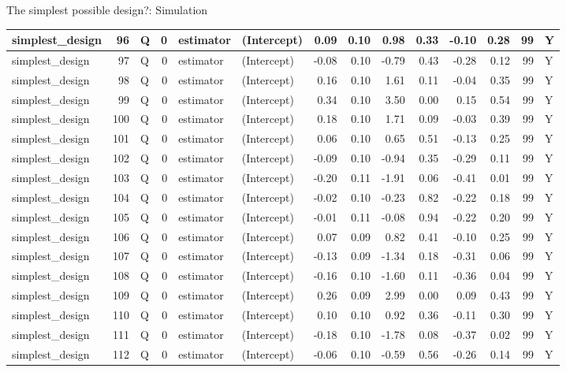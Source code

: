 \documentclass[
  11pt,
  ignorenonframetext,
]{beamer}
\begin{document}
\begin{frame}[fragile]{The simplest possible design?: Simulation}
\begin{tabular}{l|r|l|r|l|l|r|r|r|r|r|r|r|l}
\hline
simplest\_design & 96 & Q & 0 & estimator & (Intercept) & 0.09 & 0.10 & 0.98 & 0.33 & -0.10 & 0.28 & 99 & Y\\
\hline
simplest\_design & 97 & Q & 0 & estimator & (Intercept) & -0.08 & 0.10 & -0.79 & 0.43 & -0.28 & 0.12 & 99 & Y\\
\hline
simplest\_design & 98 & Q & 0 & estimator & (Intercept) & 0.16 & 0.10 & 1.61 & 0.11 & -0.04 & 0.35 & 99 & Y\\
\hline
simplest\_design & 99 & Q & 0 & estimator & (Intercept) & 0.34 & 0.10 & 3.50 & 0.00 & 0.15 & 0.54 & 99 & Y\\
\hline
simplest\_design & 100 & Q & 0 & estimator & (Intercept) & 0.18 & 0.10 & 1.71 & 0.09 & -0.03 & 0.39 & 99 & Y\\
\hline
simplest\_design & 101 & Q & 0 & estimator & (Intercept) & 0.06 & 0.10 & 0.65 & 0.51 & -0.13 & 0.25 & 99 & Y\\
\hline
simplest\_design & 102 & Q & 0 & estimator & (Intercept) & -0.09 & 0.10 & -0.94 & 0.35 & -0.29 & 0.11 & 99 & Y\\
\hline
simplest\_design & 103 & Q & 0 & estimator & (Intercept) & -0.20 & 0.11 & -1.91 & 0.06 & -0.41 & 0.01 & 99 & Y\\
\hline
simplest\_design & 104 & Q & 0 & estimator & (Intercept) & -0.02 & 0.10 & -0.23 & 0.82 & -0.22 & 0.18 & 99 & Y\\
\hline
simplest\_design & 105 & Q & 0 & estimator & (Intercept) & -0.01 & 0.11 & -0.08 & 0.94 & -0.22 & 0.20 & 99 & Y\\
\hline
simplest\_design & 106 & Q & 0 & estimator & (Intercept) & 0.07 & 0.09 & 0.82 & 0.41 & -0.10 & 0.25 & 99 & Y\\
\hline
simplest\_design & 107 & Q & 0 & estimator & (Intercept) & -0.13 & 0.09 & -1.34 & 0.18 & -0.31 & 0.06 & 99 & Y\\
\hline
simplest\_design & 108 & Q & 0 & estimator & (Intercept) & -0.16 & 0.10 & -1.60 & 0.11 & -0.36 & 0.04 & 99 & Y\\
\hline
simplest\_design & 109 & Q & 0 & estimator & (Intercept) & 0.26 & 0.09 & 2.99 & 0.00 & 0.09 & 0.43 & 99 & Y\\
\hline
simplest\_design & 110 & Q & 0 & estimator & (Intercept) & 0.10 & 0.10 & 0.92 & 0.36 & -0.11 & 0.30 & 99 & Y\\
\hline
simplest\_design & 111 & Q & 0 & estimator & (Intercept) & -0.18 & 0.10 & -1.78 & 0.08 & -0.37 & 0.02 & 99 & Y\\
\hline
simplest\_design & 112 & Q & 0 & estimator & (Intercept) & -0.06 & 0.10 & -0.59 & 0.56 & -0.26 & 0.14 & 99 & Y\\

\end{tabular}
\end{frame}
\end{document}
